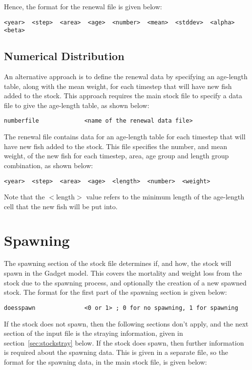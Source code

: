 \documentclass[10pt,twoside]{book}
\begin{document}
\bigskip
Hence, the format for the renewal file is given below:

{\small\begin{verbatim}
<year>  <step>  <area>  <age>  <number>  <mean>  <stddev>  <alpha>  <beta>
\end{verbatim}}

\subsection{Numerical Distribution}
An alternative approach is to define the renewal data by specifying an age-length table, along with the mean weight, for each timestep that will have new fish added to the stock.  This approach requires the main stock file to specify a data file to give the age-length table, as shown below:

{\small\begin{verbatim}
numberfile             <name of the renewal data file>
\end{verbatim}}

The renewal file contains data for an age-length table for each timestep that will have new fish added to the stock.  This file specifies the number, and mean weight, of the new fish for each timestep, area, age group and length group combination, as shown below:

{\small\begin{verbatim}
<year>  <step>  <area>  <age>  <length>  <number>  <weight>
\end{verbatim}}

Note that the $<$length$>$ value refers to the minimum length of the age-length cell that the new fish will be put into.

\section{Spawning}\label{sec:stockspawn}
The spawning section of the stock file determines if, and how, the stock will spawn in the Gadget model.   This covers the mortality and weight loss from the stock due to the spawning process, and optionally the creation of a new spawned stock.  The format for the first part of the spawning section is given below:

{\small\begin{verbatim}
doesspawn              <0 or 1> ; 0 for no spawning, 1 for spawning
\end{verbatim}}

If the stock does not spawn, then the following sections don't apply, and the next section of the input file is the straying information, given in section~\ref{sec:stockstray} below.  If the stock does spawn, then further information is required about the spawning data.  This is given in a separate file, so the format for the spawning data, in the main stock file, is given below:
\end{document}
